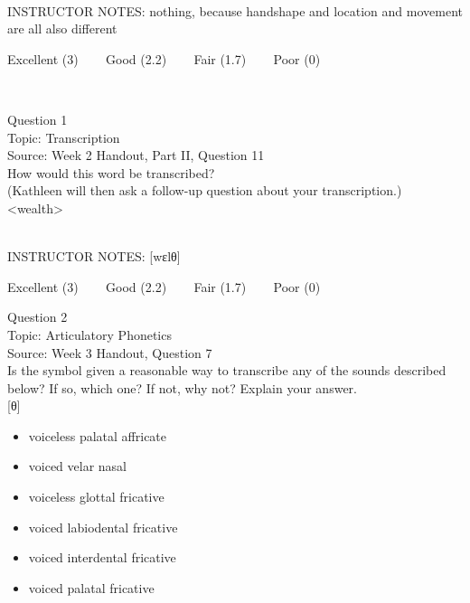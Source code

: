 \documentclass[12pt]{article}
\begin{document}
~\\
INSTRUCTOR NOTES: nothing, because handshape and location and movement are all also different


\vfill
Excellent (3) ~~~ Good (2.2) ~~~ Fair (1.7) ~~~ Poor (0)
\newpage

\begin{center}
\textbf{{\color{red}{\HUGE END OF EXAM}}}\\

\end{center}
\newpage

\begin{center}
\textbf{{\color{blue}{\HUGE START OF EXAM\\}}}

\textbf{{\color{blue}{\HUGE Student ID: 61058\\}}}

\textbf{{\color{blue}{\HUGE \\}}}

\end{center}
\newpage

{\large Question 1}\\

Topic: Transcription\\
Source: Week 2 Handout, Part II, Question 11\\

How would this word be transcribed?\\ (Kathleen will then ask a follow-up question about your transcription.)\\

<wealth>


~\\
INSTRUCTOR NOTES: [wɛlθ]


\vfill
Excellent (3) ~~~ Good (2.2) ~~~ Fair (1.7) ~~~ Poor (0)
\newpage

{\large Question 2}\\

Topic: Articulatory Phonetics\\
Source: Week 3 Handout, Question 7\\

Is the symbol given a reasonable way to transcribe any of the sounds described below? If so, which one? If not, why not? Explain your answer.\\

{[θ]}

\begin{itemize} \item voiceless palatal affricate \item voiced velar nasal \item voiceless glottal fricative \item voiced labiodental fricative \item voiced interdental fricative \item voiced palatal fricative \end{itemize}
\end{document}
